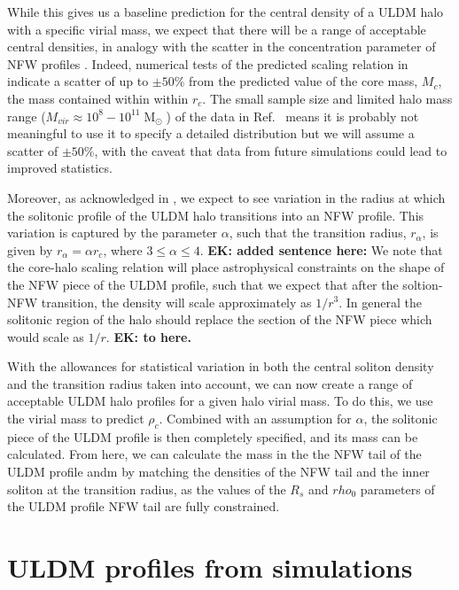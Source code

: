 \documentclass[a4paper,11pt]{article}
\newcommand{\ek}[1]{{{\bf \color{red} EK: #1}}}
\begin{document}
While this gives us a baseline prediction for the central density of a ULDM halo with a specific virial mass, we expect that there will be a range of acceptable central densities, in analogy with the scatter in the concentration parameter of NFW profiles \cite{Maccio:2008pcd}. Indeed, numerical tests of the predicted scaling relation in \cite{Schive:2014hza} indicate a scatter of up to $\pm 50\%$ from the  predicted value of the core mass, $M_c$, the mass contained within  within $r_c$. The small sample size and limited halo mass range ($ M_{vir} \approx 10^8-10^{11} \operatorname{M}_{\odot}$)  of the data in Ref.~\cite{Schive:2014hza} means it is probably not meaningful to use it to specify a detailed distribution but we will assume a scatter of $\pm 50\%$, with the caveat that data from future simulations could lead to improved statistics.

Moreover, as acknowledged in \cite{Robles:2018fur}, we expect to see variation in the radius at which the solitonic profile of the ULDM halo transitions into an NFW profile. This variation is captured by the parameter $\alpha$, such that the transition radius, $r_{\alpha}$, is given by $r_{\alpha} = \alpha r_c$, where $3 \leq \alpha \leq 4$. \ek{added sentence here:} We note that the core-halo scaling relation will place astrophysical constraints on the shape of the NFW piece of the ULDM profile, such that we expect that after the soltion-NFW transition, the density will scale approximately as $1/r^3$. In general the solitonic region of the halo should replace the section of the NFW piece which would scale as $1/r$. \ek{to here.} 


With the allowances for statistical variation in both the central soliton density and the transition radius taken into account, we can now create a range of acceptable ULDM halo profiles for a given halo virial mass. To do this, we use the virial mass to predict $\rho_c$. Combined with an assumption for $\alpha$, the solitonic piece of the ULDM profile is then completely specified, and its mass can be calculated. From here, we can calculate the mass in the the NFW tail of the ULDM profile andm by matching the densities of the NFW tail and the inner soliton at the transition radius, as the values of the $R_s$ and $rho_0$ parameters of the ULDM profile NFW tail are fully constrained.  



\section{ULDM profiles from simulations}\label{sec:sim_comparison}
\end{document}
